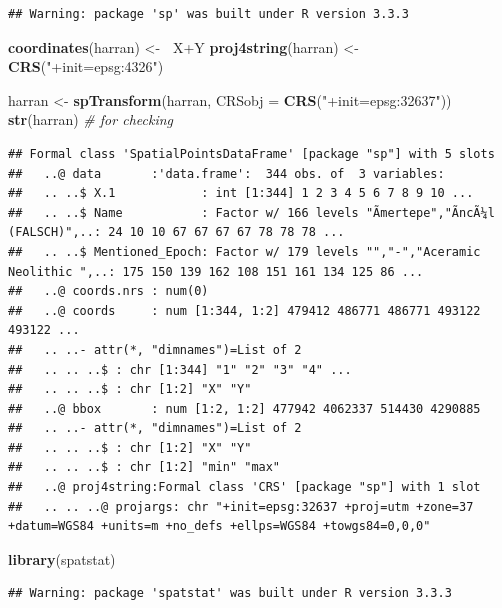 \documentclass[]{article}
\newenvironment{Shaded}{\begin{snugshade}}{\end{snugshade}}
\newcommand{\KeywordTok}[1]{\textcolor[rgb]{0.13,0.29,0.53}{\textbf{{#1}}}}
\newcommand{\DataTypeTok}[1]{\textcolor[rgb]{0.13,0.29,0.53}{{#1}}}
\newcommand{\StringTok}[1]{\textcolor[rgb]{0.31,0.60,0.02}{{#1}}}
\newcommand{\CommentTok}[1]{\textcolor[rgb]{0.56,0.35,0.01}{\textit{{#1}}}}
\newcommand{\ErrorTok}[1]{\textcolor[rgb]{0.64,0.00,0.00}{\textbf{{#1}}}}
\newcommand{\NormalTok}[1]{{#1}}
\begin{document}
\begin{verbatim}
## Warning: package 'sp' was built under R version 3.3.3
\end{verbatim}

\begin{Shaded}
\begin{Highlighting}[]
\KeywordTok{coordinates}\NormalTok{(harran) <-}\StringTok{ }\ErrorTok{~}\NormalTok{X+Y}
\KeywordTok{proj4string}\NormalTok{(harran) <-}\StringTok{ }\KeywordTok{CRS}\NormalTok{(}\StringTok{"+init=epsg:4326"}\NormalTok{)}

\NormalTok{harran <-}\StringTok{ }\KeywordTok{spTransform}\NormalTok{(harran, }\DataTypeTok{CRSobj =} \KeywordTok{CRS}\NormalTok{(}\StringTok{"+init=epsg:32637"}\NormalTok{))}
\KeywordTok{str}\NormalTok{(harran) }\CommentTok{# for checking}
\end{Highlighting}
\end{Shaded}

\begin{verbatim}
## Formal class 'SpatialPointsDataFrame' [package "sp"] with 5 slots
##   ..@ data       :'data.frame':  344 obs. of  3 variables:
##   .. ..$ X.1            : int [1:344] 1 2 3 4 5 6 7 8 9 10 ...
##   .. ..$ Name           : Factor w/ 166 levels "Ãmertepe","ÃncÃ¼l (FALSCH)",..: 24 10 10 67 67 67 67 78 78 78 ...
##   .. ..$ Mentioned_Epoch: Factor w/ 179 levels "","-","Aceramic Neolithic ",..: 175 150 139 162 108 151 161 134 125 86 ...
##   ..@ coords.nrs : num(0) 
##   ..@ coords     : num [1:344, 1:2] 479412 486771 486771 493122 493122 ...
##   .. ..- attr(*, "dimnames")=List of 2
##   .. .. ..$ : chr [1:344] "1" "2" "3" "4" ...
##   .. .. ..$ : chr [1:2] "X" "Y"
##   ..@ bbox       : num [1:2, 1:2] 477942 4062337 514430 4290885
##   .. ..- attr(*, "dimnames")=List of 2
##   .. .. ..$ : chr [1:2] "X" "Y"
##   .. .. ..$ : chr [1:2] "min" "max"
##   ..@ proj4string:Formal class 'CRS' [package "sp"] with 1 slot
##   .. .. ..@ projargs: chr "+init=epsg:32637 +proj=utm +zone=37 +datum=WGS84 +units=m +no_defs +ellps=WGS84 +towgs84=0,0,0"
\end{verbatim}

\begin{Shaded}
\begin{Highlighting}[]
\KeywordTok{library}\NormalTok{(spatstat)}
\end{Highlighting}
\end{Shaded}

\begin{verbatim}
## Warning: package 'spatstat' was built under R version 3.3.3
\end{verbatim}
\end{document}
